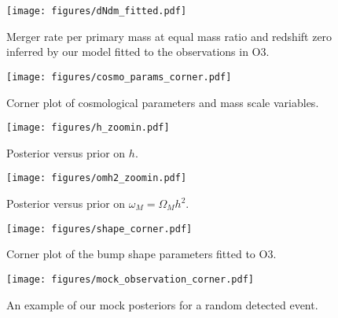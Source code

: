 \documentclass[modern]{aastex631}
\begin{document}
\begin{figure}
    \begin{center}
        \texttt{[image: figures/dNdm\_fitted.pdf]}
    \end{center}
    \caption{Merger rate per primary mass at equal mass ratio and redshift zero inferred by our model fitted to the observations in O3.}
    \label{fig:dNdm_fitted}
\end{figure}

\begin{figure}
    \begin{center}
        \texttt{[image: figures/cosmo\_params\_corner.pdf]}
    \end{center}
    \caption{Corner plot of cosmological parameters and mass scale variables.}
    \label{fig:cosmo-params-corner}
\end{figure}

\begin{figure}
    \begin{center}
        \texttt{[image: figures/h\_zoomin.pdf]}
    \end{center}
    \caption{Posterior versus prior on $h$.}
    \label{fig:h-zoomin}
\end{figure}

\begin{figure}
    \begin{center}
        \texttt{[image: figures/omh2\_zoomin.pdf]}
    \end{center}
    \caption{Posterior versus prior on $\omega_M = \Omega_M h^2$.}
    \label{fig:omh2-zoomin}
\end{figure}

\begin{figure}
    \begin{center}
        \texttt{[image: figures/shape\_corner.pdf]}
    \end{center}
    \caption{Corner plot of the bump shape parameters fitted to O3.}
    \label{fig:shape-corner}
\end{figure}

\begin{figure}
    \begin{center}
        \texttt{[image: figures/mock\_observation\_corner.pdf]}
    \end{center}
    \caption{An example of our mock posteriors for a random detected event.}
    \label{fig:mock-observation-corner}
\end{figure}


\end{document}
